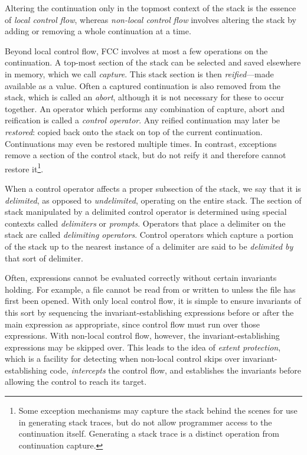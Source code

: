 \documentclass[11pt]{article}
\begin{document}
Altering the continuation only in the topmost context of the stack is the essence of \emph{local control flow}, whereas \emph{non-local control flow} involves altering the stack by adding or removing a whole continuation at a time.

Beyond local control flow, FCC involves at most a few operations on the continuation.
A top-most section of the stack can be selected and saved elsewhere in memory, which we call \emph{capture}.
This stack section is then \emph{reified}---made available as a value.
Often a captured continuation is also removed from the stack, which is called an \emph{abort}, although it is not necessary for these to occur together.
An operator which performs any combination of capture, abort and reification is called a \emph{control operator}.
Any reified continuation may later be \emph{restored}: copied back onto the stack on top of the current continuation.
Continuations may even be restored multiple times.
In contrast, exceptions remove a section of the control stack, but do not reify it and therefore cannot restore it\footnote{Some exception mechanisms may capture the stack behind the scenes for use in generating stack traces, but do not allow programmer access to the continuation itself. Generating a stack trace is a distinct operation from continuation capture.}.

When a control operator affects a proper subsection of the stack, we say that it is \emph{delimited}, as opposed to \emph{undelimited}, operating on the entire stack.
The section of stack manipulated by a delimited control operator is determined using special contexts called \emph{delimiters} or \emph{prompts}.
Operators that place a delimiter on the stack are called \emph{delimiting operators}.
Control operators which capture a portion of the stack up to the nearest instance of a delimiter are said to be \emph{delimited by} that sort of delimiter.

Often, expressions cannot be evaluated correctly without certain invariants holding.
For example, a file cannot be read from or written to unless the file has first been opened.
With only local control flow, it is simple to ensure invariants of this sort by sequencing the invariant-establishing expressions before or after the main expression as appropriate, since control flow must run over those expressions.
With non-local control flow, however, the invariant-establishing expressions may be skipped over.
This leads to the idea of \emph{extent protection}, which is a facility for detecting when non-local control skips over invariant-establishing code, \emph{intercepts} the control flow, and establishes the invariants before allowing the control to reach its target.
\end{document}
